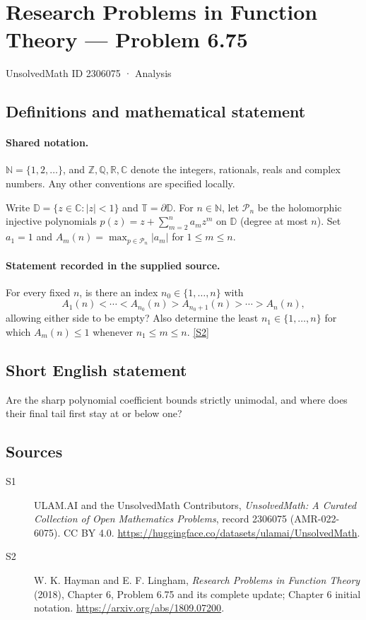 \documentclass[11pt]{article}
\newcommand{\sref}[2]{\hyperlink{source:#1:#2}{[S#2]}}
\begin{document}
\setcounter{section}{2306074}
\section{Research Problems in Function Theory — Problem 6.75}\label{2306075}
{\small\sffamily UnsolvedMath ID 2306075 · Analysis}
\subsection{Definitions and mathematical statement}

\paragraph{Shared notation.}$\mathbb N=\{1,2,\ldots\}$, and $\mathbb Z,\mathbb Q,\mathbb R,\mathbb C$ denote the integers, rationals, reals and complex numbers. Any other conventions are specified locally.


Write $\mathbb D=\{z\in\mathbb C:|z|<1\}$ and $\mathbb T=\partial\mathbb D$. For $n\in\mathbb N$, let $\mathcal P_n$ be the holomorphic injective polynomials $p(z)=z+\sum_{m=2}^n a_mz^m$ on $\mathbb D$ (degree at most $n$). Set $a_1=1$ and $A_m(n)=\max_{p\in\mathcal P_n}|a_m|$ for $1\le m\le n$.
\paragraph{Statement recorded in the supplied source.}
For every fixed $n$, is there an index $n_0\in\{1,\ldots,n\}$ with \[A_1(n)<\cdots<A_{n_0}(n)>A_{n_0+1}(n)>\cdots>A_n(n),\] allowing either side to be empty? Also determine the least $n_1\in\{1,\ldots,n\}$ for which $A_m(n)\le1$ whenever $n_1\le m\le n$. \sref{2306075}{2}
\subsection{Short English statement}
Are the sharp polynomial coefficient bounds strictly unimodal, and where does their final tail first stay at or below one?
\subsection{Sources}
\begin{description}
\item[\hypertarget{source:2306075:1}{S1}] ULAM.AI and the UnsolvedMath Contributors, \emph{UnsolvedMath: A Curated Collection of Open Mathematics Problems}, record 2306075 (AMR-022-6075). CC BY 4.0. \url{https://huggingface.co/datasets/ulamai/UnsolvedMath}.
\item[\hypertarget{source:2306075:2}{S2}] W. K. Hayman and E. F. Lingham, \emph{Research Problems in Function Theory} (2018), Chapter 6, Problem 6.75 and its complete update; Chapter 6 initial notation. \url{https://arxiv.org/abs/1809.07200}.
\end{description}
\label{end:2306075}
\end{document}
